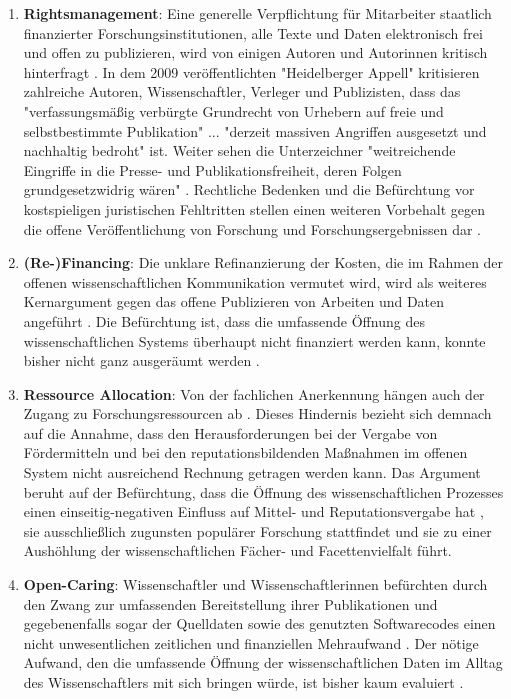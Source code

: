 \begin{enumerate}
\item \textbf{Rightsmanagement}: Eine generelle Verpflichtung für Mitarbeiter staatlich finanzierter Forschungsinstitutionen, alle Texte und Daten elektronisch frei und offen zu publizieren, wird von einigen Autoren und Autorinnen kritisch hinterfragt \cite{Peukert_2013}. In dem 2009 veröffentlichten "Heidelberger Appell" \cite{Heidelberger_Appell_2009} kritisieren zahlreiche Autoren, Wissenschaftler, Verleger und Publizisten, dass das "verfassungsmäßig verbürgte Grundrecht von Urhebern auf freie und selbstbestimmte Publikation" ... "derzeit massiven Angriffen ausgesetzt und nachhaltig bedroht" ist. Weiter sehen die Unterzeichner "weitreichende Eingriffe in die Presse- und Publikationsfreiheit, deren Folgen grundgesetzwidrig wären" \cite{ITK_2009}. Rechtliche Bedenken und die Befürchtung vor kostspieligen juristischen Fehltritten stellen einen weiteren Vorbehalt gegen die offene Veröffentlichung von Forschung und Forschungsergebnissen dar \cite{Weishaupt_2009}.
\item \textbf{(Re-)Financing}: Die unklare Refinanzierung der Kosten, die im Rahmen der offenen wissenschaftlichen Kommunikation vermutet wird, wird als weiteres Kernargument gegen das offene Publizieren von Arbeiten und Daten angeführt \cite{Chibnik_2015}. Die Befürchtung ist, dass die umfassende Öffnung des wissenschaftlichen Systems überhaupt nicht finanziert werden kann, konnte bisher nicht ganz ausgeräumt werden \cite{Weishaupt_2009}.
\item \textbf{Ressource Allocation}: Von der fachlichen Anerkennung hängen auch der Zugang zu Forschungsressourcen ab \cite[:14]{Buss_2001}. Dieses Hindernis bezieht sich demnach auf die Annahme, dass den Herausforderungen bei der Vergabe von Fördermitteln und bei den reputationsbildenden Maßnahmen im offenen System nicht ausreichend Rechnung getragen werden kann. Das Argument beruht auf der Befürchtung, dass die Öffnung des wissenschaftlichen Prozesses einen einseitig-negativen Einfluss auf Mittel- und Reputationsvergabe hat \cite{Grand_2012}, sie ausschließlich zugunsten populärer Forschung stattfindet und sie zu einer Aushöhlung der wissenschaftlichen Fächer- und Facettenvielfalt führt.
\item \textbf{Open-Caring}: Wissenschaftler und Wissenschaftlerinnen befürchten durch den Zwang zur umfassenden Bereitstellung ihrer Publikationen und gegebenenfalls sogar der Quelldaten sowie des genutzten Softwarecodes einen nicht unwesentlichen zeitlichen und finanziellen Mehraufwand \cite[:27]{BBAW_2015} \cite{Mennes_2013} \cite{Grand_2012}. Der nötige Aufwand, den die umfassende Öffnung der wissenschaftlichen Daten im Alltag des Wissenschaftlers mit sich bringen würde, ist bisher kaum evaluiert \cite{Osterloh_2008}.

\end{enumerate}
